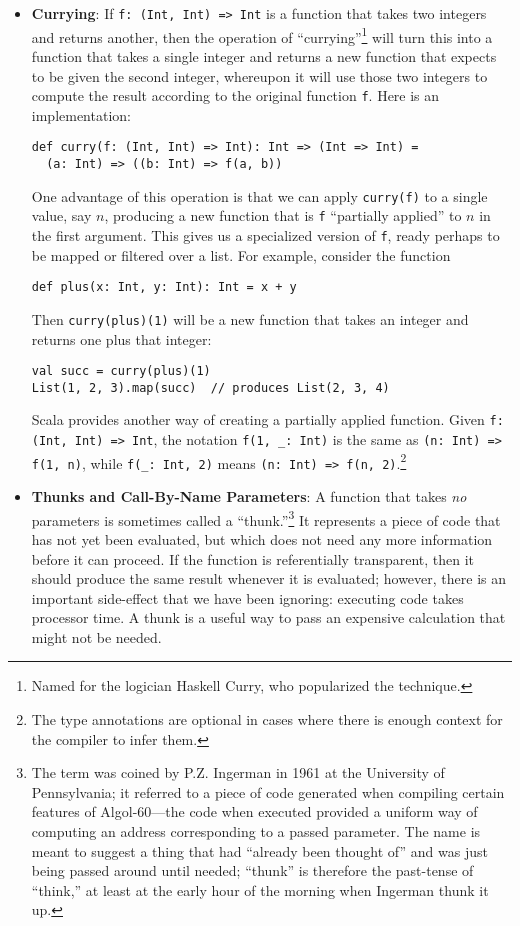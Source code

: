 \begin{itemize}
\item \textbf{Currying}: If \verb|f: (Int, Int) => Int| is a function that takes two integers and returns another, then the operation of ``currying''\footnote{Named for the logician Haskell Curry, who popularized the technique.} will turn this into a function that takes a single integer and returns a new function that expects to be given the second integer, whereupon it will use those two integers to compute the result according to the original function \verb|f|. Here is an implementation:
\begin{verbatim}
def curry(f: (Int, Int) => Int): Int => (Int => Int) =
  (a: Int) => ((b: Int) => f(a, b))
\end{verbatim}
One advantage of this operation is that we can apply \verb|curry(f)| to a single value, say $n$, producing a new function that is \verb|f| ``partially applied'' to $n$ in the first argument. This gives us a specialized version of \verb|f|, ready perhaps to be mapped or filtered over a list. For example, consider the function
\begin{verbatim}
def plus(x: Int, y: Int): Int = x + y
\end{verbatim}
Then \verb|curry(plus)(1)| will be a new function that takes an integer and returns one plus that integer:
\begin{verbatim}
val succ = curry(plus)(1)
List(1, 2, 3).map(succ)  // produces List(2, 3, 4)
\end{verbatim}

Scala provides another way of creating a partially applied function. Given \verb|f: (Int, Int) => Int|, the notation \verb|f(1, _: Int)| is the same as \verb|(n: Int) => f(1, n)|, while \verb|f(_: Int, 2)| means \verb|(n: Int) => f(n, 2)|.\footnote{The type annotations are optional in cases where there is enough context for the compiler to infer them.}

\item \textbf{Thunks and Call-By-Name Parameters}: A function that takes \emph{no} parameters is sometimes called a ``thunk.''\footnote{The term was coined by P.Z. Ingerman in 1961 at the University of Pennsylvania; it referred to a piece of code generated when compiling certain features of Algol-60---the code when executed provided a uniform way of computing an address corresponding to a passed parameter. The name is meant to suggest a thing that had ``already been thought of'' and was just being passed around until needed; ``thunk'' is therefore the past-tense of ``think,'' at least at the early hour of the morning when Ingerman thunk it up.} It represents a piece of code that has not yet been evaluated, but which does not need any more information before it can proceed. If the function is referentially transparent, then it should produce the same result whenever it is evaluated; however, there is an important side-effect that we have been ignoring: executing code takes processor time. A thunk is a useful way to pass an expensive calculation that might not be needed.


\end{itemize}
